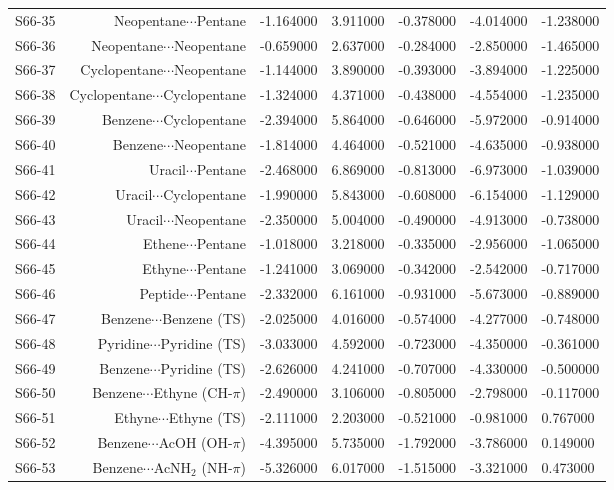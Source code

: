 \begin{table}
\begin{adjustbox}{center}
\begin{tabular}{lrrrrr}
S66-35 & Neopentane$\cdots$Pentane & -1.164000 & 3.911000 & -0.378000 & -4.014000 & -1.238000 \\
S66-36 & Neopentane$\cdots$Neopentane & -0.659000 & 2.637000 & -0.284000 & -2.850000 & -1.465000 \\
S66-37 & Cyclopentane$\cdots$Neopentane & -1.144000 & 3.890000 & -0.393000 & -3.894000 & -1.225000 \\
S66-38 & Cyclopentane$\cdots$Cyclopentane & -1.324000 & 4.371000 & -0.438000 & -4.554000 & -1.235000 \\
S66-39 & Benzene$\cdots$Cyclopentane & -2.394000 & 5.864000 & -0.646000 & -5.972000 & -0.914000 \\
S66-40 & Benzene$\cdots$Neopentane & -1.814000 & 4.464000 & -0.521000 & -4.635000 & -0.938000 \\
S66-41 & Uracil$\cdots$Pentane & -2.468000 & 6.869000 & -0.813000 & -6.973000 & -1.039000 \\
S66-42 & Uracil$\cdots$Cyclopentane & -1.990000 & 5.843000 & -0.608000 & -6.154000 & -1.129000 \\
S66-43 & Uracil$\cdots$Neopentane & -2.350000 & 5.004000 & -0.490000 & -4.913000 & -0.738000 \\
S66-44 & Ethene$\cdots$Pentane & -1.018000 & 3.218000 & -0.335000 & -2.956000 & -1.065000 \\
S66-45 & Ethyne$\cdots$Pentane & -1.241000 & 3.069000 & -0.342000 & -2.542000 & -0.717000 \\
S66-46 & Peptide$\cdots$Pentane & -2.332000 & 6.161000 & -0.931000 & -5.673000 & -0.889000 \\
S66-47 & Benzene$\cdots$Benzene (TS) & -2.025000 & 4.016000 & -0.574000 & -4.277000 & -0.748000 \\
S66-48 & Pyridine$\cdots$Pyridine (TS) & -3.033000 & 4.592000 & -0.723000 & -4.350000 & -0.361000 \\
S66-49 & Benzene$\cdots$Pyridine (TS) & -2.626000 & 4.241000 & -0.707000 & -4.330000 & -0.500000 \\
S66-50 & Benzene$\cdots$Ethyne (CH-$\pi$) & -2.490000 & 3.106000 & -0.805000 & -2.798000 & -0.117000 \\
S66-51 & Ethyne$\cdots$Ethyne (TS) & -2.111000 & 2.203000 & -0.521000 & -0.981000 & 0.767000 \\
S66-52 & Benzene$\cdots$AcOH (OH-$\pi$) & -4.395000 & 5.735000 & -1.792000 & -3.786000 & 0.149000 \\
S66-53 & Benzene$\cdots$AcNH$_2$ (NH-$\pi$) & -5.326000 & 6.017000 & -1.515000 & -3.321000 & 0.473000 \\

\end{tabular}
\end{adjustbox}
\end{table}
